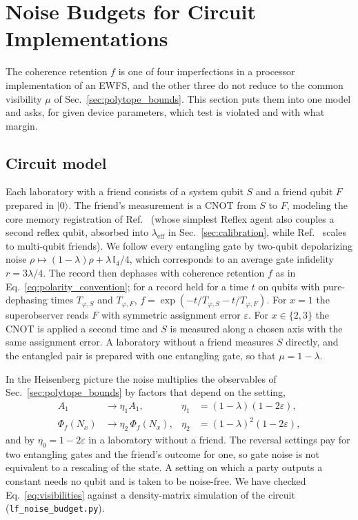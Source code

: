 \section{Noise Budgets for Circuit Implementations}
\label{sec:noise_budget}

The coherence retention $f$ is one of four imperfections in a processor implementation of an EWFS, and the other three do not reduce to the common visibility $\mu$ of Sec.~\ref{sec:polytope_bounds}. This section puts them into one model and asks, for given device parameters, which test is violated and with what margin.

\subsection{Circuit model}

Each laboratory with a friend consists of a system qubit $S$ and a friend qubit $F$ prepared in $|0\rangle$. The friend's measurement is a CNOT from $S$ to $F$, modeling the core memory registration of Ref.~\cite{laux2026} (whose simplest Reflex agent also couples a second reflex qubit, absorbed into $\lambda_{\mathrm{eff}}$ in Sec.~\ref{sec:calibration}, while Ref.~\cite{zeng2024} scales to multi-qubit friends). We follow every entangling gate by two-qubit depolarizing noise $\rho \mapsto (1-\lambda)\rho + \lambda\,\mathbb{I}_4/4$, which corresponds to an average gate infidelity $r = 3\lambda/4$. The record then dephases with coherence retention $f$ as in Eq.~\eqref{eq:polarity_convention}; for a record held for a time $t$ on qubits with pure-dephasing times $T_{\varphi,S}$ and $T_{\varphi,F}$, $f = \exp(-t/T_{\varphi,S} - t/T_{\varphi,F})$. For $x = 1$ the superobserver reads $F$ with symmetric assignment error $\varepsilon$. For $x \in \{2, 3\}$ the CNOT is applied a second time and $S$ is measured along a chosen axis with the same assignment error. A laboratory without a friend measures $S$ directly, and the entangled pair is prepared with one entangling gate, so that $\mu = 1 - \lambda$.

In the Heisenberg picture the noise multiplies the observables of Sec.~\ref{sec:polytope_bounds} by factors that depend on the setting,
\begin{equation}
\begin{aligned}
    A_1 &\to \eta_1 A_1, & \eta_1 &= (1-\lambda)(1-2\varepsilon), \\
    \Phi_f(N_x) &\to \eta_2\,\Phi_f(N_x), & \eta_2 &= (1-\lambda)^2(1-2\varepsilon),
\end{aligned}
\label{eq:visibilities}
\end{equation}
and by $\eta_0 = 1 - 2\varepsilon$ in a laboratory without a friend. The reversal settings pay for two entangling gates and the friend's outcome for one, so gate noise is not equivalent to a rescaling of the state. A setting on which a party outputs a constant needs no qubit and is taken to be noise-free. We have checked Eq.~\eqref{eq:visibilities} against a density-matrix simulation of the circuit (\texttt{lf\_noise\_budget.py}).

